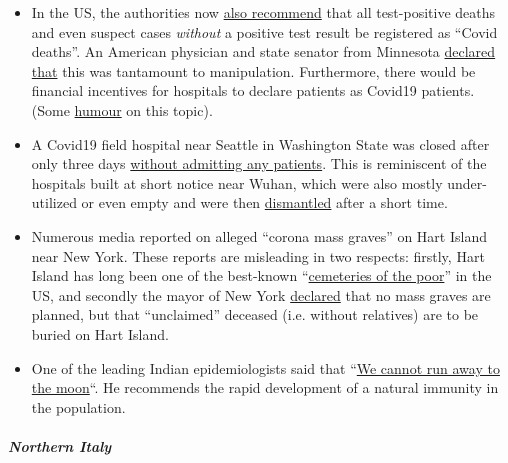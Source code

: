 \begin{itemize}
\tightlist
\item
  In the US, the authorities now
  \href{https://nypost.com/2020/04/07/feds-classify-all-coronavirus-patient-deaths-as-covid-19-deaths/?link=TD_mansionglobal_new_mansion_global.11147f181987fd93}{also
  recommend} that all test-positive deaths and even suspect cases
  \emph{without} a positive test result be registered as ``Covid
  deaths''. An American physician and state senator from Minnesota
  \href{https://www.valleynewslive.com/content/misc/Sen-Dr-Jensens-Shocking-Admission-About-Coronavirus-569458361.html}{declared
  that} this was tantamount to manipulation. Furthermore, there would be
  financial incentives for hospitals to declare patients as Covid19
  patients. (Some
  \href{https://swprs.files.wordpress.com/2020/04/cv-2019-2020.jpg}{humour}
  on this topic).
\item
  A Covid19 field hospital near Seattle in Washington State was closed
  after only three days
  \href{https://www.yahoo.com/news/armys-seattle-field-hospital-closes-165646379.html}{without
  admitting any patients}. This is reminiscent of the hospitals built at
  short notice near Wuhan, which were also mostly under-utilized or even
  empty and were then
  \href{https://www.theguardian.com/world/2020/feb/12/what-chinas-empty-new-coronavirus-hospitals-say-about-its-secretive-system}{dismantled}
  after a short time.
\item
  Numerous media reported on alleged ``corona mass graves'' on Hart
  Island near New York. These reports are misleading in two respects:
  firstly, Hart Island has long been one of the best-known
  ``\href{https://en.wikipedia.org/wiki/Hart_Island_(Bronx)\#Cemetery}{cemeteries
  of the poor}'' in the US, and secondly the mayor of New York
  \href{https://www.independent.co.uk/news/world/americas/new-york-coronavirus-cases-burials-bodies-covid-19-hart-island-a9459956.html}{declared}
  that no mass graves are planned, but that ``unclaimed'' deceased (i.e.
  without relatives) are to be buried on Hart Island.
\item
  One of the leading Indian epidemiologists said that
  ``\href{https://www.business-standard.com/article/current-affairs/we-cannot-run-away-to-the-moon-need-to-develop-herd-immunity-dr-muliyil-120040601232_1.html}{We
  cannot run away to the moon}``. He recommends the rapid development of
  a natural immunity in the population.
\end{itemize}

\hypertarget{northern-italy}{%
\subparagraph{\texorpdfstring{\textbf{Northern
Italy}}{Northern Italy}}\label{northern-italy}}

